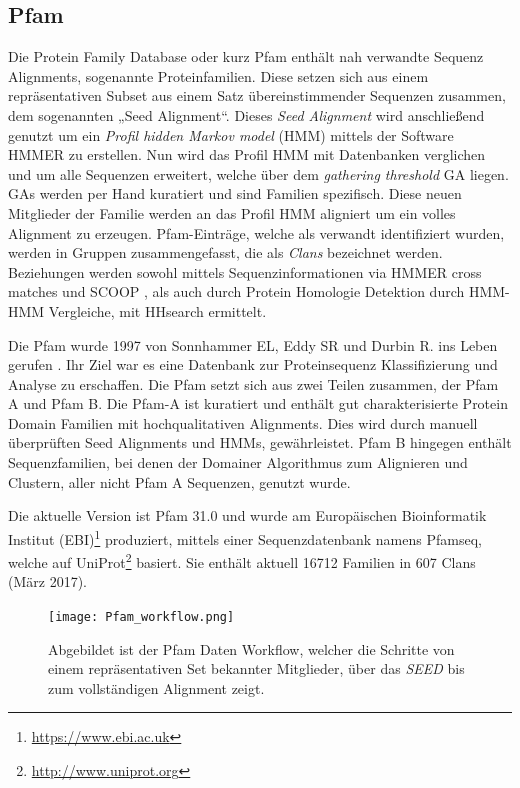 \subsection{Pfam}

Die Protein Family Database\cite{Finn.2014} oder kurz Pfam enthält nah verwandte Sequenz Alignments, sogenannte Proteinfamilien. Diese setzen sich aus einem repräsentativen Subset aus einem Satz übereinstimmender Sequenzen zusammen, dem sogenannten „Seed Alignment“. Dieses \emph{Seed Alignment} wird anschließend genutzt um ein \emph{Profil hidden Markov model} (HMM) \cite{Soding.2005} mittels der Software HMMER\cite{Mistry.2013} zu erstellen. Nun wird das Profil HMM mit Datenbanken verglichen und um alle Sequenzen erweitert, welche über dem \emph{gathering threshold} GA liegen. GAs werden per Hand kuratiert und sind Familien spezifisch. Diese neuen Mitglieder der Familie werden an das Profil HMM aligniert um ein volles Alignment zu erzeugen. Pfam-Einträge, welche als verwandt identifiziert wurden, werden in Gruppen zusammengefasst, die als \emph{Clans} bezeichnet werden. Beziehungen werden sowohl mittels Sequenzinformationen via HMMER cross matches und SCOOP \cite{Bateman.2007}, als auch durch Protein Homologie Detektion durch HMM-HMM Vergleiche, mit HHsearch \cite{Fidler.2016} ermittelt.

Die Pfam wurde 1997 von Sonnhammer EL, Eddy SR und Durbin R. ins Leben gerufen \cite{Sonnhammer.1997}. Ihr Ziel war es eine Datenbank zur Proteinsequenz Klassifizierung und Analyse zu erschaffen. Die Pfam setzt sich aus zwei Teilen zusammen, der Pfam A und Pfam B. Die Pfam-A ist kuratiert und enthält gut charakterisierte Protein Domain Familien mit hochqualitativen Alignments. Dies wird durch manuell überprüften Seed Alignments und HMMs, gewährleistet. Pfam B hingegen enthält Sequenzfamilien, bei denen der Domainer Algorithmus zum Alignieren und Clustern, aller nicht Pfam A Sequenzen, genutzt wurde. 

Die aktuelle Version ist Pfam 31.0 und wurde am Europäischen Bioinformatik Institut (EBI)\footnote{\url{https://www.ebi.ac.uk}} produziert, mittels einer Sequenzdatenbank namens Pfamseq, welche auf UniProt\footnote{\url{http://www.uniprot.org}} basiert. Sie enthält aktuell 16712 Familien in 607 Clans (März 2017).
\begin{figure}
\texttt{[image: Pfam\_workflow.png]}
\caption{Abgebildet ist der \ac{Pfam} Daten Workflow, welcher die Schritte von einem repräsentativen Set bekannter Mitglieder, über das \emph{SEED} bis zum vollständigen Alignment zeigt.}
\label{fig:Pfam_workflow}
\end{figure}

